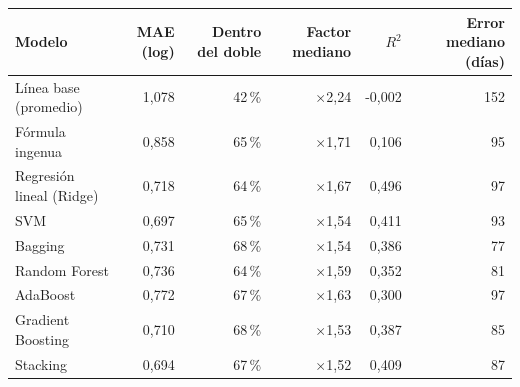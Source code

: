 \begin{tabular}{lrrrrr}
\toprule
Modelo & MAE (log) & Dentro del doble & Factor mediano & $R^2$ & Error mediano (días) \\
\midrule
Línea base (promedio) & 1,078 & 42\,\% & $\times$2,24 & -0,002 & 152 \\
Fórmula ingenua & 0,858 & 65\,\% & $\times$1,71 & 0,106 & 95 \\
Regresión lineal (Ridge) & 0,718 & 64\,\% & $\times$1,67 & 0,496 & 97 \\
SVM & 0,697 & 65\,\% & $\times$1,54 & 0,411 & 93 \\
Bagging & 0,731 & 68\,\% & $\times$1,54 & 0,386 & 77 \\
Random Forest & 0,736 & 64\,\% & $\times$1,59 & 0,352 & 81 \\
AdaBoost & 0,772 & 67\,\% & $\times$1,63 & 0,300 & 97 \\
Gradient Boosting & 0,710 & 68\,\% & $\times$1,53 & 0,387 & 85 \\
Stacking & 0,694 & 67\,\% & $\times$1,52 & 0,409 & 87 \\
\bottomrule
\end{tabular}
